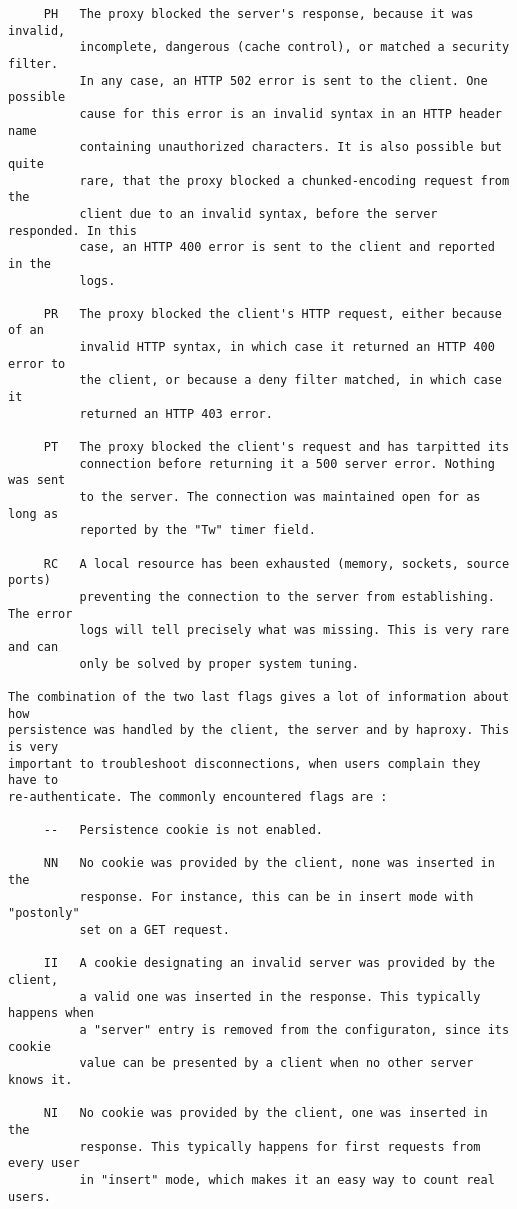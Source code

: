 \begin{verbatim}
     PH   The proxy blocked the server's response, because it was invalid,
          incomplete, dangerous (cache control), or matched a security filter.
          In any case, an HTTP 502 error is sent to the client. One possible
          cause for this error is an invalid syntax in an HTTP header name
          containing unauthorized characters. It is also possible but quite
          rare, that the proxy blocked a chunked-encoding request from the
          client due to an invalid syntax, before the server responded. In this
          case, an HTTP 400 error is sent to the client and reported in the
          logs.

     PR   The proxy blocked the client's HTTP request, either because of an
          invalid HTTP syntax, in which case it returned an HTTP 400 error to
          the client, or because a deny filter matched, in which case it
          returned an HTTP 403 error.

     PT   The proxy blocked the client's request and has tarpitted its
          connection before returning it a 500 server error. Nothing was sent
          to the server. The connection was maintained open for as long as
          reported by the "Tw" timer field.

     RC   A local resource has been exhausted (memory, sockets, source ports)
          preventing the connection to the server from establishing. The error
          logs will tell precisely what was missing. This is very rare and can
          only be solved by proper system tuning.

The combination of the two last flags gives a lot of information about how
persistence was handled by the client, the server and by haproxy. This is very
important to troubleshoot disconnections, when users complain they have to
re-authenticate. The commonly encountered flags are :

     --   Persistence cookie is not enabled.

     NN   No cookie was provided by the client, none was inserted in the
          response. For instance, this can be in insert mode with "postonly"
          set on a GET request.

     II   A cookie designating an invalid server was provided by the client,
          a valid one was inserted in the response. This typically happens when
          a "server" entry is removed from the configuraton, since its cookie
          value can be presented by a client when no other server knows it.

     NI   No cookie was provided by the client, one was inserted in the
          response. This typically happens for first requests from every user
          in "insert" mode, which makes it an easy way to count real users.


\end{verbatim}
